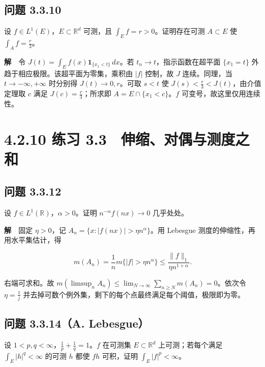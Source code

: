 \documentclass[11pt,a4paper]{article}
\begin{document}
\subsection{问题 3.3.10}\label{ux95eeux9898-3.3.10}

设 \(f\in L^1(E)\)，\(E\subset\mathbb R^d\) 可测，且
\(\int_E f=r>0\)。证明存在可测 \(A\subset E\) 使 \(\int_A f=\frac r3\)。

\textbf{解}　令 \(J(t)=\int_E f(x)\mathbf1_{\{x_1<t\}}\,dx\)。若
\(t_n\to t\)，指示函数在超平面 \(\{x_1=t\}\)
外趋于相应极限。该超平面为零集，乘积由 \(|f|\) 控制，故 \(J\)
连续。同理，当 \(t\to-\infty,+\infty\) 时分别得 \(J(t)\to0,r\)。可取
\(s<t\) 使 \(J(s)<\frac r3<J(t)\)，由介值定理取 \(c\) 满足
\(J(c)=\frac r3\)；所求即 \(A=E\cap\{x_1<c\}\)。\(f\)
可变号，故这里仅用连续性。

\clearpage\section[\S{}4.2.10 练习
3.3　伸缩、对偶与测度之和]{4.2.10 练习
3.3　伸缩、对偶与测度之和}\label{ux7ec3ux4e60-3.3-ux4f38ux7f29ux5bf9ux5076ux4e0eux6d4bux5ea6ux4e4bux548c}

\subsection{问题 3.3.12}\label{ux95eeux9898-3.3.12}

设 \(f\in L^1(\mathbb R)\)，\(\alpha>0\)。证明 \(n^{-\alpha}f(nx)\to0\)
几乎处处。

\textbf{解}　固定 \(\eta>0\)，记 \(A_n=\{x:|f(nx)|>\eta n^\alpha\}\)。用
Lebesgue 测度的伸缩性，再用水平集估计，得

\begin{equation*}
m(A_n)=\frac1n m\{|f|>\eta n^\alpha\}
 \le\frac{\|f\|_1}{\eta n^{1+\alpha}} .
\end{equation*}

右端可求和。故
\(m(\limsup_n A_n)\le\lim_{N\to\infty}\sum_{n\ge N}m(A_n)=0\)。依次令
\(\eta=\frac{1}{j}\)
并去掉可数个例外集，剩下的每个点最终满足每个阈值，极限即为零。

\subsection{问题 3.3.14（A.
Lebesgue）}\label{ux95eeux9898-3.3.14a.-lebesgue}

设 \(1<p,q<\infty\)，\(\frac{1}{p}+\frac{1}{q}=1\)。\(f\) 在可测集
\(E\subset\mathbb R^d\) 上可测；若每个满足 \(\int_E|h|^q<\infty\) 的可测
\(h\) 都使 \(fh\) 可积，证明 \(\int_E|f|^p<\infty\)。
\end{document}
